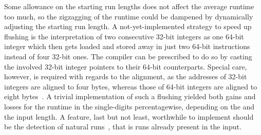 Some allowance on the starting run lengths does not affect the average runtime too much, so the zigzagging of the runtime could be dampened by dynamically adjusting the starting run length.
A not-yet-implemented strategy to speed up flushing is the interpretation of two consecutive 32-bit integers as one 64-bit integer which then gets loaded and stored away in just two 64-bit instructions instead of four 32-bit ones.
The compiler can be prescribed to do so by casting the involved 32-bit integer pointers to their 64-bit counterparts.
Special care, however, is required with regards to the alignment, as the addresses of 32-bit integers are aligned to four bytes, whereas those of 64-bit integers are aligned to eight bytes~\cite[DPU ABI -- Data types]{upmemSDK}.
A trivial implementation of such a flushing yielded both gains and losses for the runtime in the single-digits percentagewise, depending on the \MS{} and the input length.
A feature, last but not least, worthwhile to implement should be the detection of natural runs~\cites[Section~2.6]{lang2009algorithmen}[Section~2.3.2]{wirth1975algorithmen}, that is runs already present in the input.

